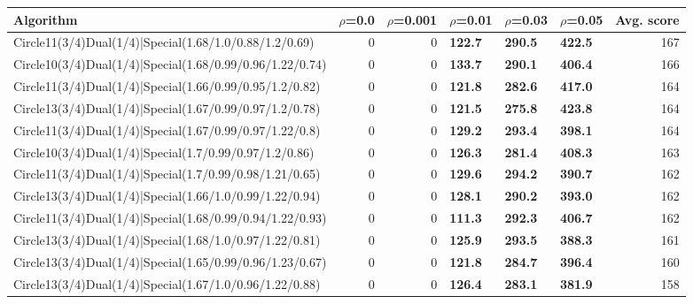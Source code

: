 \begin{tabular}{lrrlllr}
\hline
 Algorithm                                                    &   $\rho$=0.0 &   $\rho$=0.001 & $\rho$=0.01    & $\rho$=0.03    & $\rho$=0.05    &   Avg. score \\
\hline
 Circle11(3/4)Dual(1/4)|Special(1.68/1.0/0.88/1.2/0.69)       &          0   &            0   & \textbf{122.7} & \textbf{290.5} & \textbf{422.5} &          167 \\
 Circle10(3/4)Dual(1/4)|Special(1.68/0.99/0.96/1.22/0.74)     &          0   &            0   & \textbf{133.7} & \textbf{290.1} & \textbf{406.4} &          166 \\
 Circle11(3/4)Dual(1/4)|Special(1.66/0.99/0.95/1.2/0.82)      &          0   &            0   & \textbf{121.8} & \textbf{282.6} & \textbf{417.0} &          164 \\
 Circle13(3/4)Dual(1/4)|Special(1.67/0.99/0.97/1.2/0.78)      &          0   &            0   & \textbf{121.5} & \textbf{275.8} & \textbf{423.8} &          164 \\
 Circle11(3/4)Dual(1/4)|Special(1.67/0.99/0.97/1.22/0.8)      &          0   &            0   & \textbf{129.2} & \textbf{293.4} & \textbf{398.1} &          164 \\
 Circle10(3/4)Dual(1/4)|Special(1.7/0.99/0.97/1.2/0.86)       &          0   &            0   & \textbf{126.3} & \textbf{281.4} & \textbf{408.3} &          163 \\
 Circle11(3/4)Dual(1/4)|Special(1.7/0.99/0.98/1.21/0.65)      &          0   &            0   & \textbf{129.6} & \textbf{294.2} & \textbf{390.7} &          162 \\
 Circle13(3/4)Dual(1/4)|Special(1.66/1.0/0.99/1.22/0.94)      &          0   &            0   & \textbf{128.1} & \textbf{290.2} & \textbf{393.0} &          162 \\
 Circle11(3/4)Dual(1/4)|Special(1.68/0.99/0.94/1.22/0.93)     &          0   &            0   & \textbf{111.3} & \textbf{292.3} & \textbf{406.7} &          162 \\
 Circle13(3/4)Dual(1/4)|Special(1.68/1.0/0.97/1.22/0.81)      &          0   &            0   & \textbf{125.9} & \textbf{293.5} & \textbf{388.3} &          161 \\
 Circle13(3/4)Dual(1/4)|Special(1.65/0.99/0.96/1.23/0.67)     &          0   &            0   & \textbf{121.8} & \textbf{284.7} & \textbf{396.4} &          160 \\
 Circle13(3/4)Dual(1/4)|Special(1.67/1.0/0.96/1.22/0.88)      &          0   &            0   & \textbf{126.4} & \textbf{283.1} & \textbf{381.9} &          158 \\

\end{tabular}
